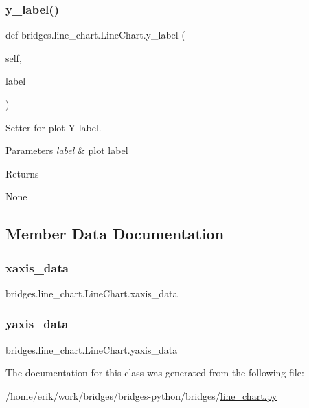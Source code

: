 \subsubsection{\texorpdfstring{y\+\_\+label()}{y\_label()}\hspace{0.1cm}{\footnotesize\ttfamily [2/2]}}
{\footnotesize\ttfamily def bridges.\+line\+\_\+chart.\+Line\+Chart.\+y\+\_\+label (\begin{DoxyParamCaption}\item[{}]{self,  }\item[{}]{label }\end{DoxyParamCaption})}



Setter for plot Y label. 


\begin{DoxyParams}{Parameters}
{\em label} & plot label \\
\hline
\end{DoxyParams}
\begin{DoxyReturn}{Returns}


None 
\end{DoxyReturn}


\subsection{Member Data Documentation}
\mbox{\label{classbridges_1_1line__chart_1_1_line_chart_a13a52ecfbe82477fd6203aaa7569c1c7}} 
\subsubsection{\texorpdfstring{xaxis\+\_\+data}{xaxis\_data}}
{\footnotesize\ttfamily bridges.\+line\+\_\+chart.\+Line\+Chart.\+xaxis\+\_\+data}

\mbox{\label{classbridges_1_1line__chart_1_1_line_chart_ae32afdcdfe6398ef247f9431de603495}} 
\subsubsection{\texorpdfstring{yaxis\+\_\+data}{yaxis\_data}}
{\footnotesize\ttfamily bridges.\+line\+\_\+chart.\+Line\+Chart.\+yaxis\+\_\+data}



The documentation for this class was generated from the following file\+:\begin{DoxyCompactItemize}
\item 
/home/erik/work/bridges/bridges-\/python/bridges/\hyperlink{line__chart_8py}{line\+\_\+chart.\+py}\end{DoxyCompactItemize}
